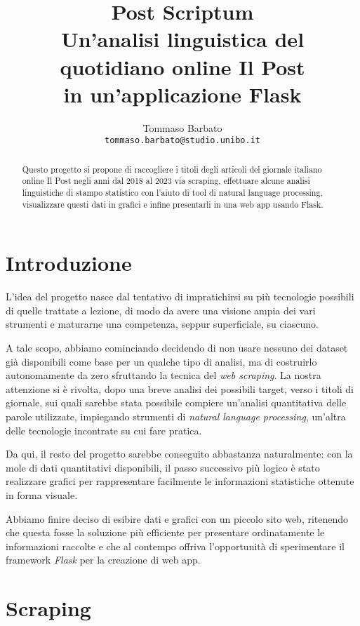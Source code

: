 \documentclass[11pt]{article}
\title{%
  Post Scriptum \\[0.2em]
  \large Un'analisi linguistica del quotidiano online Il Post \\
    in un'applicazione Flask}
\author{Tommaso Barbato \\
  {\tt tommaso.barbato@studio.unibo.it}}
\date{}
\begin{document}
\maketitle

\begin{abstract}
  Questo progetto si propone di raccogliere i titoli degli articoli del
  giornale italiano online Il Post negli anni dal 2018 al 2023 via scraping,
  effettuare alcune analisi linguistiche di stampo statistico con l'aiuto
  di tool di natural language processing, visualizzare questi dati in grafici
  e infine presentarli in una web app usando Flask.
\end{abstract}

\section{Introduzione}

L'idea del progetto nasce dal tentativo di impratichirsi su più tecnologie
possibili di quelle trattate a lezione, di modo da avere una visione ampia
dei vari strumenti e maturarne una competenza, seppur superficiale, su ciascuno.

A tale scopo, abbiamo cominciando decidendo di non usare nessuno dei dataset
già disponibili come base per un qualche tipo di analisi, ma di costruirlo 
autonomamente da zero sfruttando la tecnica del \textit{web scraping}.
La nostra attenzione si è rivolta, dopo una breve analisi dei possibili target,
verso i titoli di giornale, sui quali sarebbe stata possibile compiere un'analisi
quantitativa delle parole utilizzate, impiegando strumenti di \textit{natural
language processing}, un'altra delle tecnologie incontrate su cui fare pratica.

Da qui, il resto del progetto sarebbe conseguito abbastanza naturalmente: con la 
mole di dati quantitativi disponibili, il passo successivo più logico è stato
realizzare grafici per rappresentare facilmente le informazioni statistiche
ottenute in forma visuale.

Abbiamo finire deciso di esibire dati e grafici con un piccolo sito web, ritenendo
che questa fosse la soluzione più efficiente per presentare ordinatamente le
informazioni raccolte e che al contempo offriva l'opportunità di sperimentare
il framework \textit{Flask} per la creazione di web app.

\section{Scraping}
\end{document}
